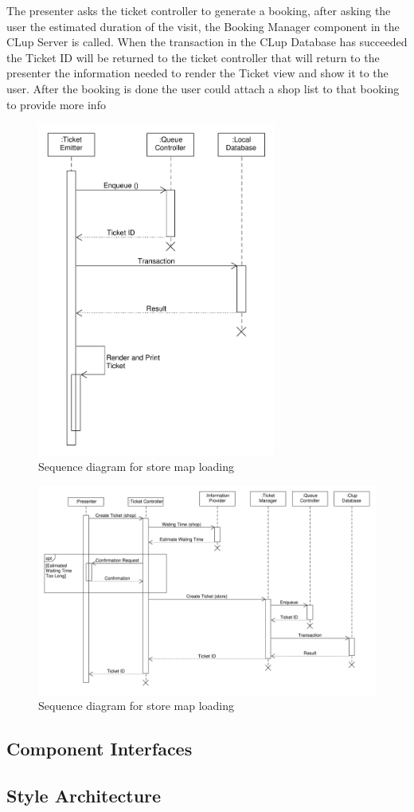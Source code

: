 The presenter asks the ticket controller to generate a booking, after asking the user the estimated duration of the visit, the Booking Manager component in the CLup Server is called.
When the transaction in the CLup Database has succeeded the Ticket ID will be returned to the ticket controller that will return to the presenter the information needed to render the Ticket view and show it to the user. After the booking is done the user could attach a shop list to that booking to provide more info 
\begin{figure}[H]
    \includegraphics[width=0.7\textwidth]{Images/UML_paper_ticket_sequence.pdf}
    \caption{\label{fig:UML_paper_ticket_sequence}Sequence diagram for store map loading}
\end{figure}
\begin{figure}[H]
    \includegraphics[width=\textwidth]{Images/UML_virtual_ticket_sequence.pdf}
    \caption{\label{fig:UML_virtual_ticket_sequence}Sequence diagram for store map loading}
\end{figure}
\subsection{Component Interfaces}

\subsection{Style Architecture}

